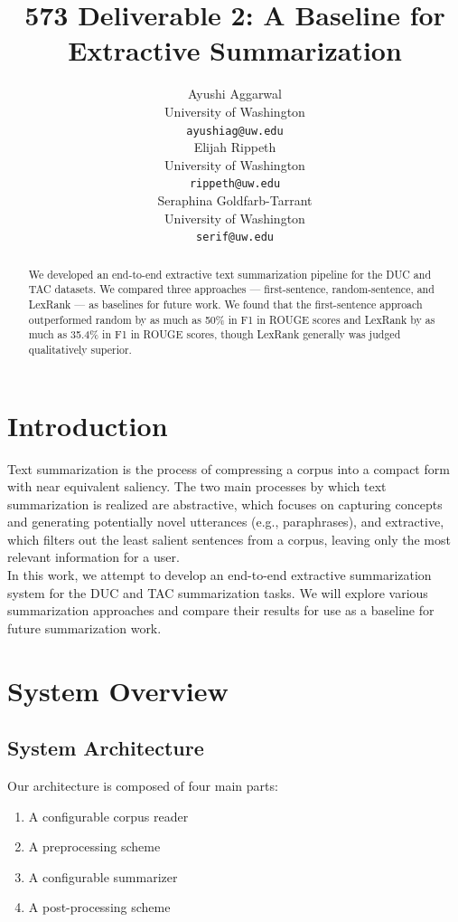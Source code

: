 \documentclass[11pt]{article}
\title{573 Deliverable 2: A Baseline for Extractive Summarization}
\author{Ayushi Aggarwal  \\
  University of Washington \\
  {\tt ayushiag@uw.edu} \\\And
  Elijah Rippeth \\
  University of Washington \\
  {\tt rippeth@uw.edu} \\\And
  Seraphina Goldfarb-Tarrant \\
  University of Washington\\
  {\tt serif@uw.edu} \\}
\date{}
\begin{document}
\maketitle
\begin{abstract}
  We developed an end-to-end extractive text summarization pipeline for the DUC and TAC datasets. We compared three approaches --- first-sentence, random-sentence, and LexRank --- as baselines for future work. We found that the first-sentence approach outperformed random by as much as 50\% in F1 in ROUGE scores and LexRank by as much as 35.4\% in F1 in ROUGE scores, though LexRank generally was judged qualitatively superior.
\end{abstract}

\section{Introduction}

Text summarization is the process of compressing a corpus into a compact form with near equivalent saliency. The two main processes by which text summarization is realized are abstractive, which focuses on capturing concepts and generating potentially novel utterances (e.g., paraphrases), and extractive, which filters out the least salient sentences from a corpus, leaving only the most relevant information for a user. \\

In this work, we attempt to develop an end-to-end extractive summarization system for the DUC and TAC summarization tasks. We will explore various summarization approaches and compare their results for use as a baseline for future summarization work.

\section{System Overview}
\subsection{System Architecture}

Our architecture is composed of four main parts:

\begin{enumerate}
\item A configurable corpus reader
\item A preprocessing scheme
\item A configurable summarizer 
\item A post-processing scheme
\end{enumerate}
\end{document}
